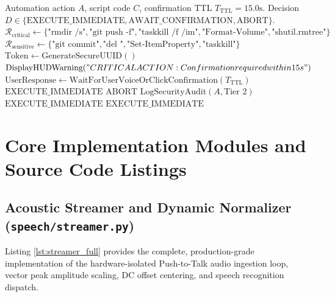 \begin{algorithm}[htbp]
\caption{3-Tier Security Guard Policy Evaluation}
\label{alg:security_guard}
\begin{algorithmic}[1]
\Require Automation action $A$, script code $C$, confirmation TTL $T_{\text{TTL}} = 15.0\text{s}$.
\Ensure Decision $D \in \{\text{EXECUTE\_IMMEDIATE}, \text{AWAIT\_CONFIRMATION}, \text{ABORT}\}$.
\State $\mathcal{R}_{\text{critical}} \gets \{\text{"rmdir /s"}, \text{"git push -f"}, \text{"taskkill /f /im"}, \text{"Format-Volume"}, \text{"shutil.rmtree"}\}$
\State $\mathcal{R}_{\text{sensitive}} \gets \{\text{"git commit"}, \text{"del "}, \text{"Set-ItemProperty"}, \text{"taskkill"}\}$
    \State $\text{Token} \gets \text{GenerateSecureUUID}()$
    \State $\text{DisplayHUDWarning}("CRITICAL ACTION: Confirmation required within 15s")$
    \State $\text{UserResponse} \gets \text{WaitForUserVoiceOrClickConfirmation}(T_{\text{TTL}})$
        \State \Return $\text{EXECUTE\_IMMEDIATE}$
    \Else
        \State \Return $\text{ABORT}$
    \EndIf
{}
    \State $\text{LogSecurityAudit}(A, \text{Tier 2})$
    \State \Return $\text{EXECUTE\_IMMEDIATE}$
\Else
    \State \Return $\text{EXECUTE\_IMMEDIATE}$ 
\EndIf
\end{algorithmic}
\end{algorithm}

\section{Core Implementation Modules and Source Code Listings}

\subsection{Acoustic Streamer and Dynamic Normalizer (\texttt{speech/streamer.py})}
Listing \ref{lst:streamer_full} provides the complete, production-grade implementation of the hardware-isolated Push-to-Talk audio ingestion loop, vector peak amplitude scaling, DC offset centering, and speech recognition dispatch.

